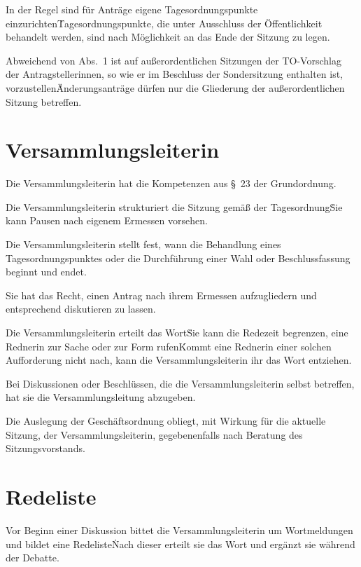 \begin{multicols}{2}
\Abs \Satz In der Regel sind für Anträge eigene Tagesordnungspunkte einzurichten\. Tages\-ordnungspunkte, die unter Ausschluss der Öffentlichkeit behandelt werden, sind nach Möglichkeit an das Ende der Sitzung zu legen.

\Abs \Satz Abweichend von Abs.~1 ist auf außerordentlichen Sitzungen der TO-Vorschlag der Antragstellerinnen, so wie er im Beschluss der Sondersitzung enthalten ist, vorzustellen\. Änderungsanträge dürfen nur die Gliederung der außerordentlichen Sitzung betreffen.



\section{Versammlungsleiterin}

\Abs \Satz Die Versammlungsleiterin hat die Kompetenzen aus §~23 der Grundordnung.

\Abs \Satz Die Versammlungsleiterin strukturiert die Sitzung gemäß der Tagesordnung\. Sie kann Pausen nach eigenem Ermessen vorsehen.

\Abs \Satz Die Versammlungsleiterin stellt fest, wann die Behandlung eines Tagesordnungspunktes oder die Durchführung einer Wahl oder Beschlussfassung beginnt und endet.

\Abs \Satz Sie hat das Recht, einen Antrag nach ihrem Ermessen aufzugliedern und entsprechend diskutieren zu lassen.

\Abs \Satz Die Versammlungsleiterin erteilt das Wort\. Sie kann die Redezeit begrenzen, eine Rednerin zur Sache oder zur Form rufen\. Kommt eine Rednerin einer solchen Aufforderung nicht nach, kann die Versammlungsleiterin ihr das Wort entziehen.

\Abs \Satz Bei Diskussionen oder Beschlüssen, die die Versammlungsleiterin selbst betreffen, hat sie die Versammlungsleitung abzugeben.

\Abs \Satz Die Auslegung der Geschäftsordnung obliegt, mit Wirkung für die aktuelle Sitzung, der Versammlungsleiterin, gegebenenfalls nach Beratung des Sitzungsvorstands.



\section{Redeliste}

\Abs \Satz Vor Beginn einer Diskussion bittet die Versammlungsleiterin um Wortmeldungen und bildet eine Redeliste\. Nach dieser erteilt sie das Wort und ergänzt sie während der Debatte.


\end{multicols}
